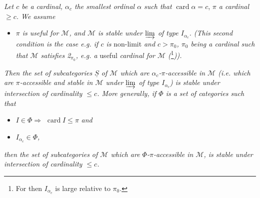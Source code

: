 \documentclass[11pt]{article}
\newcommand{\card}{\operatorname{card}}
\begin{document}
\textit{Let $c$ be a cardinal, $\alpha_c$ the smallest ordinal $\alpha$ such that} $\card\alpha=c$, \textit{$\pi$ a cardinal $\geqslant c$. We assume}
\begin{itemize}
\item[$(*)$] \textit{$\pi$ is useful for $\mathcal{M}$, and $\mathcal{M}$ is stable under $\varinjlim$ of type $I_{\alpha_c}$. (This second condition is the case e.g. if $c$ is} non-limit \textit{and $c>\pi_0$, $\pi_0$ being a cardinal such that $\mathcal{M}$ satisfies \textit{2}$_{\pi_0}$, e.g. a} useful \textit{cardinal for $\mathcal{M}$ (}\footnote[131]{For then $I_{\alpha_c}$ is large relative to $\pi_0$.}\textit{)).}
\end{itemize}
\textit{Then the set of subcategories $\underline{S}$ of $\mathcal{M}$ which are $\alpha_c$-$\pi$-accessible in $\mathcal{M}$ (i.e. which are $\pi$-accessible and stable in $\mathcal{M}$ under $\varinjlim$ of type $I_{\alpha_c}$) is stable under intersection of cardinality $\leqslant c$. More generally, if $\Phi$ is a set of categories such that} %
\begin{itemize}
\item[\textit{1°)}] \textit{$I\in\Phi\Longrightarrow$} $\card I\leqslant\pi$ \textit{and}
\item[\textit{2°)}] \textit{$I_{\alpha_c}\in\Phi$,}
\end{itemize}
\textit{then the set of subcategories of $\mathcal{M}$ which are $\Phi$-$\pi$-accessible in $\mathcal{M}$, is stable under intersection of cardinality $\leqslant c$.}
\end{document}
